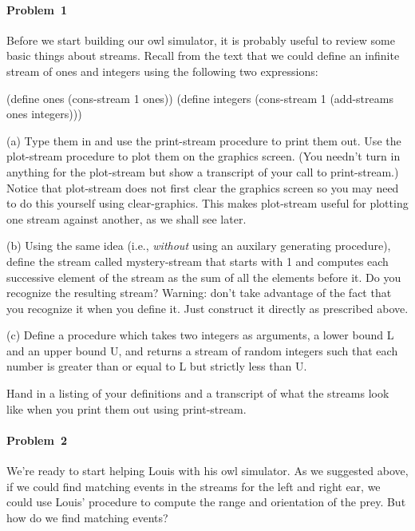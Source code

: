 \smallskip

\paragraph{Problem~1} Before we start building our owl simulator, it is
probably useful to review some basic things about streams.  Recall
from the text that we could define an infinite stream of ones and
integers using the following two expressions:

\beginlisp
(define ones     (cons-stream 1 ones))
(define integers (cons-stream 1 (add-streams ones integers)))
\endlisp

(a) Type them in and use the {\cf print-stream} procedure to print them out.
Use the {\cf plot-stream} procedure to plot them on the graphics screen. (You
needn't turn in anything for the {\cf plot-stream} but show a transcript of
your call to {\cf print-stream}.) Notice that {\cf plot-stream} does not first
clear the graphics screen so you may need to do this yourself using {\cf
clear-graphics}. This makes {\cf plot-stream} useful for plotting one stream
against another, as we shall see later.

(b) Using the same idea (i.e., {\it without\/} using an auxilary generating
procedure), define
the stream called {\cf mystery-stream} that starts with 1 and computes
each successive element of the stream as the sum of all the elements
before it.  Do you recognize the resulting stream? Warning: don't take advantage
of the fact that you recognize it when you define it. Just construct it
directly as prescribed above.

(c) Define a procedure which takes two integers as arguments, a lower bound L
and an upper bound U, and returns a stream of random integers such that each
number is greater than or equal to L but strictly less than U.

Hand in a listing of your definitions and a transcript of what the streams
look like when you print them out using {\cf print-stream}.


\paragraph{}


\paragraph{Problem~2}  We're ready to start helping Louis with his owl
simulator. As we
suggested above, if we could find matching events in the streams for the
left and right ear, we could use Louis' procedure to compute the
range and orientation of the prey.  But how do we find matching events?

